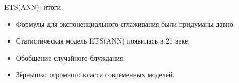 \begin{frame}{ETS(ANN): итоги}

  \begin{itemize}[<+->]
    \item Формулы для \alert{экспоненциального сглаживания} были придуманы давно.
    \item Статистическая \alert{модель} ETS(ANN) появилась в 21 веке.
    \item Обобщение случайного блуждания. 
    \item \alert{Зёрнышко} огромного класса современных моделей.
  \end{itemize}
\end{frame}


